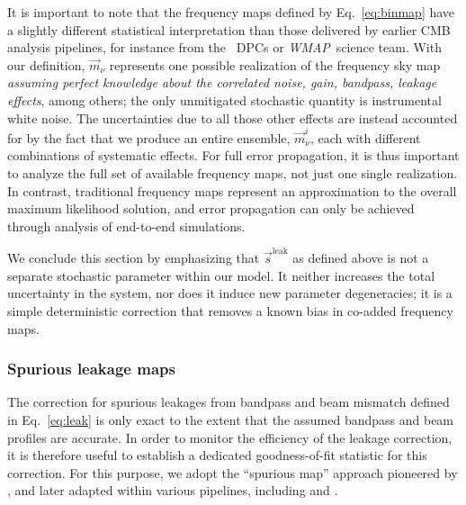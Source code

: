 \documentclass[twocolumn]{aa}
\def\WMAP{\emph{WMAP}}
\newcommand{\s}[0]{\vec{s}}
\newcommand{\m}[0]{\vec{m}}
\begin{document}
It is important to note that the frequency maps defined by
Eq.~\eqref{eq:binmap} have a slightly different statistical
interpretation than those delivered by earlier CMB analysis pipelines,
for instance from the \Planck\ DPCs or \WMAP\ science team. With our
definition, $\m_{\nu}$ represents one possible realization of the
frequency sky map \emph{assuming perfect knowledge about the
  correlated noise, gain, bandpass, leakage effects}, among others; the only
unmitigated stochastic quantity is instrumental white noise. The
uncertainties due to all those other effects are instead accounted for
by the fact that we produce an entire ensemble, $\m_{\nu}^i$, each
with different combinations of systematic effects. For full error
propagation, it is thus important to analyze the full set of available
frequency maps, not just one single realization. In contrast,
traditional frequency maps represent an approximation to the overall
maximum likelihood solution, and error propagation can only be
achieved through analysis of end-to-end simulations.

We conclude this section by emphasizing that $\s^{\mathrm{leak}}$ as
defined above is not a separate stochastic parameter within our
model. It neither increases the total uncertainty in the system, nor
does it induce new parameter degeneracies; it is a simple
deterministic correction that removes a known bias in co-added
frequency maps.

\subsubsection{Spurious leakage maps}
\label{sec:leakmaps}

The correction for spurious leakages from bandpass and beam mismatch
defined in Eq.~\eqref{eq:leak} is only exact to the extent that the
assumed bandpass and beam profiles are accurate. In order to monitor
the efficiency of the leakage correction, it is therefore useful to
establish a dedicated goodness-of-fit statistic for this correction.
For this purpose, we adopt the ``spurious map'' approach pioneered by
\citet{page2007}, and later adapted within various pipelines,
including \citet{planck2016-l02} and \citet{planck2020-LVII}.
\end{document}
